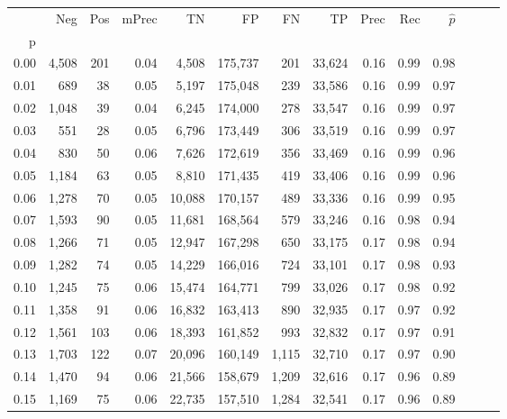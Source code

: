 \begin{tabular}{rrrrrrrrrrrrrr}
\toprule
{} &    Neg &    Pos & mPrec &       TN &       FP &      FN &      TP &  Prec &   Rec & $\hat{p}$ \\
p    &        &        &       &          &          &         &         &       &       &           \\
\midrule
0.00 &  4,508 &    201 &  0.04 &    4,508 &  175,737 &     201 &  33,624 &  0.16 &  0.99 &      0.98 \\
0.01 &    689 &     38 &  0.05 &    5,197 &  175,048 &     239 &  33,586 &  0.16 &  0.99 &      0.97 \\
0.02 &  1,048 &     39 &  0.04 &    6,245 &  174,000 &     278 &  33,547 &  0.16 &  0.99 &      0.97 \\
0.03 &    551 &     28 &  0.05 &    6,796 &  173,449 &     306 &  33,519 &  0.16 &  0.99 &      0.97 \\
0.04 &    830 &     50 &  0.06 &    7,626 &  172,619 &     356 &  33,469 &  0.16 &  0.99 &      0.96 \\
0.05 &  1,184 &     63 &  0.05 &    8,810 &  171,435 &     419 &  33,406 &  0.16 &  0.99 &      0.96 \\
0.06 &  1,278 &     70 &  0.05 &   10,088 &  170,157 &     489 &  33,336 &  0.16 &  0.99 &      0.95 \\
0.07 &  1,593 &     90 &  0.05 &   11,681 &  168,564 &     579 &  33,246 &  0.16 &  0.98 &      0.94 \\
0.08 &  1,266 &     71 &  0.05 &   12,947 &  167,298 &     650 &  33,175 &  0.17 &  0.98 &      0.94 \\
0.09 &  1,282 &     74 &  0.05 &   14,229 &  166,016 &     724 &  33,101 &  0.17 &  0.98 &      0.93 \\
0.10 &  1,245 &     75 &  0.06 &   15,474 &  164,771 &     799 &  33,026 &  0.17 &  0.98 &      0.92 \\
0.11 &  1,358 &     91 &  0.06 &   16,832 &  163,413 &     890 &  32,935 &  0.17 &  0.97 &      0.92 \\
0.12 &  1,561 &    103 &  0.06 &   18,393 &  161,852 &     993 &  32,832 &  0.17 &  0.97 &      0.91 \\
0.13 &  1,703 &    122 &  0.07 &   20,096 &  160,149 &   1,115 &  32,710 &  0.17 &  0.97 &      0.90 \\
0.14 &  1,470 &     94 &  0.06 &   21,566 &  158,679 &   1,209 &  32,616 &  0.17 &  0.96 &      0.89 \\
0.15 &  1,169 &     75 &  0.06 &   22,735 &  157,510 &   1,284 &  32,541 &  0.17 &  0.96 &      0.89 \\

\end{tabular}
